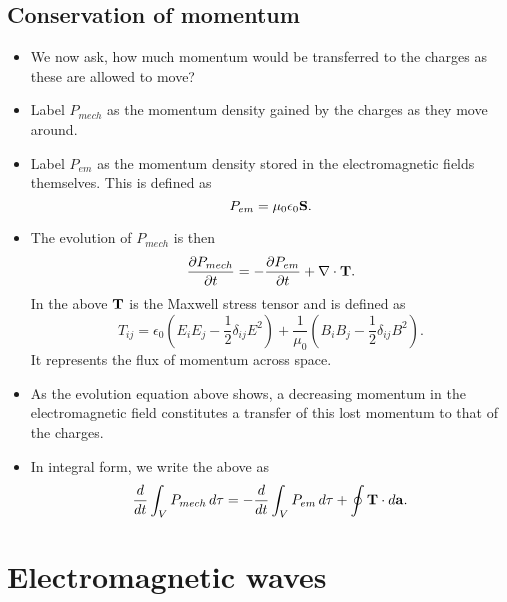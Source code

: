 \documentclass[11pt]{article}
\begin{document}
\subsection{Conservation of momentum}
\begin{itemize}
    \item We now ask, how much momentum would be transferred to the charges as these are allowed to move?
    \item Label $P_{mech}$ as the momentum density gained by the charges as they move around.
    \item Label $P_{em}$ as the momentum density stored in the electromagnetic fields themselves. This is defined as 
    \begin{equation}
        P_{em} = \mu_0 \epsilon_0 \mathbf{S}.
    \end{equation}
    \item The evolution of $P_{mech}$ is then
    \begin{equation}
        \frac{\partial P_{mech}}{\partial t} = -\frac{\partial P_{em}}{\partial t} + \nabla \cdot \mathbf{T}.
    \end{equation}
    In the above $\mathbf{T}$ is the Maxwell stress tensor and is defined as 
    \begin{equation}
        T_{ij} = \epsilon_0 \left ( E_i E_j - \frac{1}{2} \delta_{ij} E^2 \right ) + \frac{1}{\mu_0} \left ( B_i B_j - \frac{1}{2} \delta_{ij} B^2 \right ).
    \end{equation}
    It represents the flux of momentum across space.
    \item As the evolution equation above shows, a decreasing momentum in the electromagnetic field constitutes a transfer of this lost momentum to that of the charges. 
    \item In integral form, we write the above as 
    \begin{equation}
        \frac{d}{dt} \int_V P_{mech} \, d\tau = -\frac{d}{dt} \int_V P_{em} \, d\tau + \oint \mathbf{T} \cdot d\mathbf{a}.
    \end{equation}
\end{itemize}
\section{Electromagnetic waves}
\end{document}
